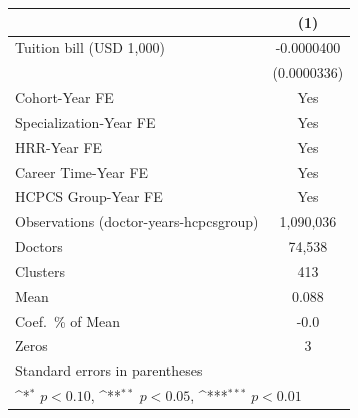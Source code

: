 {
\def\sym#1{\ifmmode^{#1}\else\(^{#1}\)\fi}
\begin{tabular}{l*{1}{c}}
\hline\hline
                    &\multicolumn{1}{c}{(1)}         \\
\hline
Tuition bill (USD 1,000)&  -0.0000400         \\
                    & (0.0000336)         \\
[1em]
Cohort-Year FE      &         Yes         \\
[1em]
Specialization-Year FE&         Yes         \\
[1em]
HRR-Year FE         &         Yes         \\
[1em]
Career Time-Year FE &         Yes         \\
[1em]
HCPCS Group-Year FE &         Yes         \\
\hline
Observations (doctor-years-hcpcsgroup)&   1,090,036         \\
Doctors             &      74,538         \\
Clusters            &         413         \\
Mean                &       0.088         \\
Coef.\ \% of Mean   &        -0.0         \\
Zeros               &           3         \\
\hline\hline
\multicolumn{2}{l}{\footnotesize Standard errors in parentheses}\\
\multicolumn{2}{l}{\footnotesize \sym{*} \(p<0.10\), \sym{**} \(p<0.05\), \sym{***} \(p<0.01\)}\\
\end{tabular}
}
